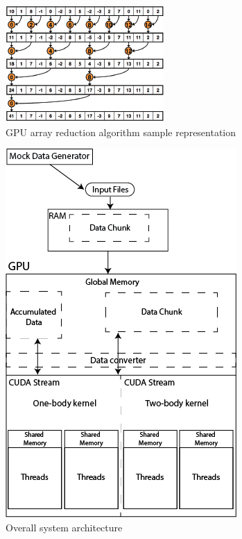 \documentclass[11pt,a4paper]{report}
\begin{document}
\begin{figure}
 \centerline{ \includegraphics[width=0.65\columnwidth]{images/reduction} }
 \caption{GPU array reduction algorithm sample representation}
 \label{fg:reduction}
\end{figure}

\begin{figure}
 \centerline{ \includegraphics[width=0.65\columnwidth]{images/overallarchitecture} }
 \caption{Overall system architecture}
 \label{fg:overallarchitecture}
\end{figure}
\end{document}
